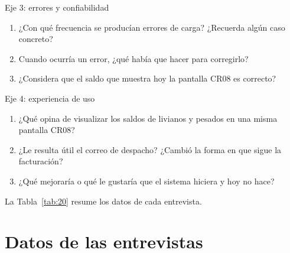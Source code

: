 Eje 3: errores y confiabilidad

\begin{enumerate}
\def\labelenumi{\arabic{enumi}.}
\setcounter{enumi}{6}
\item
  ¿Con qué frecuencia se producían errores de carga? ¿Recuerda algún caso concreto?
\item
  Cuando ocurría un error, ¿qué había que hacer para corregirlo?
\item
  ¿Considera que el saldo que muestra hoy la pantalla CR08 es correcto?
\end{enumerate}

Eje 4: experiencia de uso

\begin{enumerate}
\def\labelenumi{\arabic{enumi}.}
\setcounter{enumi}{9}
\item
  ¿Qué opina de visualizar los saldos de livianos y pesados en una misma pantalla CR08?
\item
  ¿Le resulta útil el correo de despacho? ¿Cambió la forma en que sigue la facturación?
\item
  ¿Qué mejoraría o qué le gustaría que el sistema hiciera y hoy no hace?
\end{enumerate}

La Tabla~\ref{tab:20} resume los datos de cada entrevista.

\section{Datos de las entrevistas}

